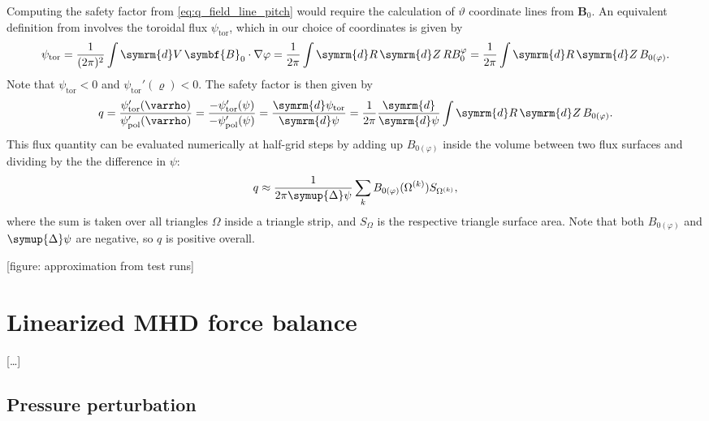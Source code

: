 \documentclass[a4paper, twoside, 10pt, english]{article}
\numberwithin{equation}{section}
\let\temp\varrho
\let\varrho\rho
\let\rho\temp
\let\temp\vartheta
\let\vartheta\theta
\let\theta\temp
\let\temp\varphi
\let\varphi\phi
\let\phi\temp
\let\vec\symbf
\newcommand*\grad{\ensuremath{\nabla}}
\newcommand*\diff{\ensuremath{\symrm{d}}}  %
\newcommand*\td[2][]{\ensuremath{\frac{\diff #1}{\diff #2}}}  %
\newcommand*\pol{\ensuremath{\textrm{pol}}}  %
\newcommand*\tor{\ensuremath{\textrm{tor}}}  %
\begin{document}
Computing the safety factor from \cref{eq:q_field_line_pitch} would require the calculation of $\theta$ coordinate lines from $\vec{B}_{0}$. An equivalent definition from \cite{dHaeseleer91} involves the toroidal flux $\psi_{\tor}$, which in our choice of coordinates is given by
\begin{gather}
  \psi_{\tor} = \frac{1}{(2 \pi)^{2}} \int \diff V \, \vec{B}_{0} \cdot \grad \phi = \frac{1}{2 \pi} \int \diff R \, \diff Z \, R B_{0}^{\phi} = \frac{1}{2 \pi} \int \diff R \, \diff Z \, B_{0 (\phi)}.
\end{gather}
Note that $\psi_{\tor} < 0$ and $\psi_{\tor}' (\rho) < 0$. The safety factor is then given by
\begin{gather}
  q = \frac{\psi_{\tor}' (\rho)}{\psi_{\pol}' (\rho)} = \frac{-\psi_{\tor}' (\psi)}{-\psi_{\pol}' (\psi)} = \td[\psi_{\tor}]{\psi} = \frac{1}{2 \pi} \td{\psi} \int \diff R \, \diff Z \, B_{0 (\phi)}.
\end{gather}
This flux quantity can be evaluated numerically at half-grid steps by adding up $B_{0 (\phi)}$ inside the volume between two flux surfaces and dividing by the the difference in $\psi$:
\begin{gather}
  q \approx \frac{1}{2 \pi \symup{\Delta} \psi} \sum_{k} B_{0 (\phi)} (\Omega^{(k)}) S_{\Omega^{(k)}},
\end{gather}
where the sum is taken over all triangles $\Omega$ inside a triangle strip, and $S_{\Omega}$ is the respective triangle surface area. Note that both $B_{0 (\phi)}$ and $\symup{\Delta} \psi$ are negative, so $q$ is positive overall.

[figure: approximation from test runs]

\clearpage
\section{Linearized MHD force balance}
\label{sec:linmhd}

[\ldots]

\subsection{Pressure perturbation}
\label{sec:compute_presn}
\end{document}
